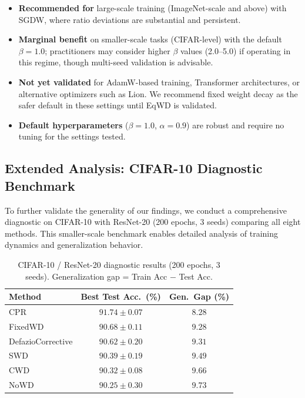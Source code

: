 \documentclass{article}
\begin{document}
\begin{itemize}
\item
  \textbf{Recommended for} large-scale training (ImageNet-scale and
  above) with SGDW, where ratio deviations are substantial and
  persistent.
\item
  \textbf{Marginal benefit} on smaller-scale tasks (CIFAR-level) with
  the default $\beta = 1.0$; practitioners may consider higher
  $\beta$ values (2.0--5.0) if operating in this regime, though
  multi-seed validation is advisable.
\item
  \textbf{Not yet validated} for AdamW-based training, Transformer
  architectures, or alternative optimizers such as Lion. We recommend
  fixed weight decay as the safer default in these settings until EqWD
  is validated.
\item
  \textbf{Default hyperparameters} ($\beta = 1.0$, $\alpha = 0.9$)
  are robust and require no tuning for the settings tested.
\end{itemize}


\subsection{Extended Analysis: CIFAR-10 Diagnostic Benchmark}
\label{sec:cifar10}

To further validate the generality of our findings, we conduct a
comprehensive diagnostic on CIFAR-10 with ResNet-20 (200 epochs, 3
seeds) comparing all eight methods. This smaller-scale benchmark enables
detailed analysis of training dynamics and generalization behavior.

\begin{table}[t]
\centering
\caption{CIFAR-10 / ResNet-20 diagnostic results (200 epochs, 3 seeds). Generalization gap = Train Acc $-$ Test Acc.}
\label{tab:cifar10}
\small
\begin{tabular}{lcc}
\toprule
Method & Best Test Acc.\ (\%) & Gen.\ Gap (\%) \\
\midrule
CPR \citep{franke2024cpr} & $\mathbf{91.74 \pm 0.07}$ & $\mathbf{8.28}$ \\
FixedWD & $90.68 \pm 0.11$ & $9.28$ \\
DefazioCorrective \citep{defazio2025} & $90.62 \pm 0.20$ & $9.31$ \\
SWD \citep{xie2023swd} & $90.39 \pm 0.19$ & $9.49$ \\
CWD \citep{chen2026cwd} & $90.32 \pm 0.08$ & $9.66$ \\
NoWD & $90.25 \pm 0.30$ & $9.73$ \\
\bottomrule
\end{tabular}
\end{table}
\end{document}
